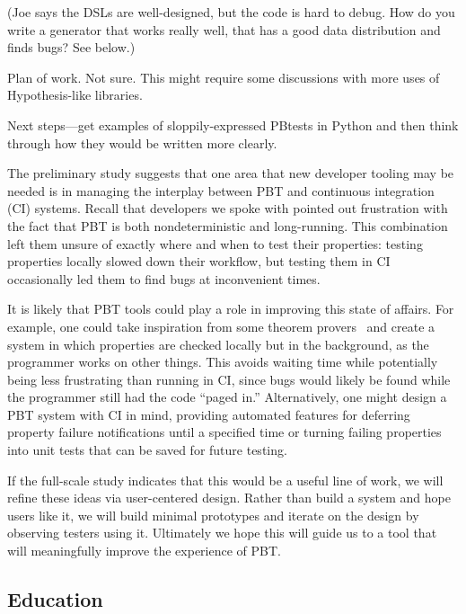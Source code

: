 (Joe says the DSLs are well-designed, but the code is hard to debug. How do you write a generator that works really well, that has a good data distribution and finds bugs? See below.)

Plan of work. Not sure. This might require some discussions with more uses of Hypothesis-like libraries.

Next steps—get examples of sloppily-expressed PBtests in Python and then think through how they would be written more clearly.


The preliminary study suggests that one area that new developer tooling may be
needed is in managing the interplay between PBT and continuous integration (CI)
systems. Recall that developers we spoke with pointed out frustration with the
fact that PBT is both nondeterministic and long-running. This combination left
them unsure of exactly where and when to test their properties: testing
properties locally slowed down their workflow, but testing them in CI
occasionally led them to find bugs at inconvenient times.

It is likely that PBT tools could play a role in improving this state of
affairs. For example, one could take inspiration from some theorem
provers~\cite{berghofer2004random} and create a system in which properties are
checked locally but in the background, as the programmer works on other things.
This avoids waiting time while potentially being less frustrating than running
in CI, since bugs would likely be found while the programmer still had the code
``paged in.'' Alternatively, one might design a PBT system with CI in mind,
providing automated features for deferring property failure notifications until
a specified time or turning failing properties into unit tests that can be saved
for future testing.

If the full-scale study indicates that this would be a useful line of work, we
will refine these ideas via user-centered design. Rather than build a system and
hope users like it, we will build minimal prototypes and iterate on the design
by observing testers using it. Ultimately we hope this will guide us to a tool
that will meaningfully improve the experience of PBT.

\subsection{Education }

